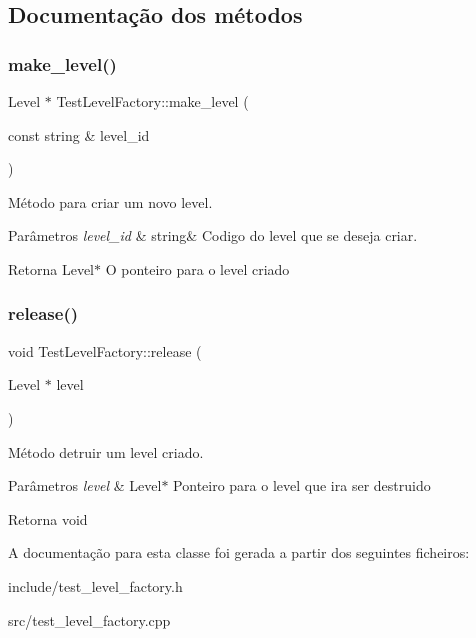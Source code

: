 \subsection{Documentação dos métodos}
\mbox{\label{classTestLevelFactory_ab661866cd93b21b0fa16cfd72ace461e}} 
\subsubsection{\texorpdfstring{make\+\_\+level()}{make\_level()}}
{\footnotesize\ttfamily Level $\ast$ Test\+Level\+Factory\+::make\+\_\+level (\begin{DoxyParamCaption}\item[{const string \&}]{level\+\_\+id }\end{DoxyParamCaption})}



Método para criar um novo level. 


\begin{DoxyParams}{Parâmetros}
{\em level\+\_\+id} & string\& Codigo do level que se deseja criar. \\
\hline
\end{DoxyParams}
\begin{DoxyReturn}{Retorna}
Level$\ast$ O ponteiro para o level criado 
\end{DoxyReturn}
\mbox{\label{classTestLevelFactory_a7771c01184257df25680ba0c8f3b5188}} 
\subsubsection{\texorpdfstring{release()}{release()}}
{\footnotesize\ttfamily void Test\+Level\+Factory\+::release (\begin{DoxyParamCaption}\item[{Level $\ast$}]{level }\end{DoxyParamCaption})}



Método detruir um level criado. 


\begin{DoxyParams}{Parâmetros}
{\em level} & Level$\ast$ Ponteiro para o level que ira ser destruido \\
\hline
\end{DoxyParams}
\begin{DoxyReturn}{Retorna}
void 
\end{DoxyReturn}


A documentação para esta classe foi gerada a partir dos seguintes ficheiros\+:\begin{DoxyCompactItemize}
\item 
include/test\+\_\+level\+\_\+factory.\+h\item 
src/test\+\_\+level\+\_\+factory.\+cpp\end{DoxyCompactItemize}

